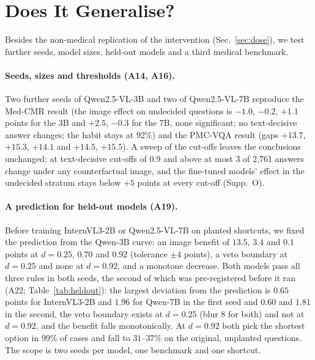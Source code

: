 \section{Does It Generalise?}
\label{sec:general}

Besides the non-medical replication of the intervention (Sec.~\ref{sec:dose}), we test further seeds, model sizes, held-out models and a third medical benchmark.

\paragraph{Seeds, sizes and thresholds (A14, A16).}
Two further seeds of Qwen2.5-VL-3B and two of Qwen2.5-VL-7B reproduce the Med-CMR result (the image effect on undecided questions is $-1.0$, $-0.2$, $+1.1$ points for the 3B and $+2.5$, $-0.3$ for the 7B, none significant; no text-decisive answer changes; the habit stays at 92\%) and the PMC-VQA result (gaps $+13.7$, $+15.3$, $+14.1$ and $+14.5$, $+15.5$).
A sweep of the cut-offs leaves the conclusions unchanged: at text-decisive cut-offs of 0.9 and above at most 3 of 2{,}761 answers change under any counterfactual image, and the fine-tuned models' effect in the undecided stratum stays below $+5$ points at every cut-off (Supp.~O).

\paragraph{A prediction for held-out models (A19).}
Before training InternVL3-2B or Qwen2.5-VL-7B on planted shortcuts, we fixed the prediction from the Qwen-3B curve: an image benefit of $13.5$, $3.4$ and $0.1$ points at $d=0.25$, $0.70$ and $0.92$ (tolerance $\pm4$ points), a veto boundary at $d=0.25$ and none at $d=0.92$, and a monotone decrease.
Both models pass all three rules in both seeds, the second of which was pre-registered before it ran (A22; Table~\ref{tab:heldout}): the largest deviation from the prediction is $0.65$ points for InternVL3-2B and $1.96$ for Qwen-7B in the first seed and $0.60$ and $1.81$ in the second, the veto boundary exists at $d=0.25$ (blur 8 for both) and not at $d=0.92$, and the benefit falls monotonically.
At $d=0.92$ both pick the shortest option in 99\% of cases and fall to $31$--$37\%$ on the original, unplanted questions.
The scope is two seeds per model, one benchmark and one shortcut.

